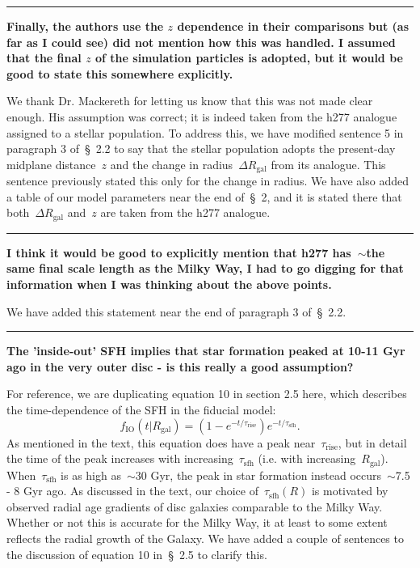 \documentclass{report}
\newcommand{\breakline}{\noindent\rule{\textwidth}{1pt}}
\begin{document}
\par\null\par 
\breakline 
\par\null\par 
\textbf{
	Finally, the authors use the $z$ dependence in their comparisons but (as 
	far as I could see) did not mention how this was handled. 
	I assumed that the final $z$ of the simulation particles is adopted, but it 
	would be good to state this somewhere explicitly. 
} 
\par 
We thank Dr. Mackereth for letting us know that this was not made clear enough. 
His assumption was correct; it is indeed taken from the h277 analogue assigned 
to a stellar population. 
To address this, we have modified sentence 5 in paragraph 3 of~\S~2.2 to say 
that the stellar population adopts the present-day midplane distance~$z$ and 
the change in radius~$\Delta R_\text{gal}$ from its analogue. 
This sentence previously stated this only for the change in radius. 
We have also added a table of our model parameters near the end of~\S~2, and 
it is stated there that both~$\Delta R_\text{gal}$ and~$z$ are taken from 
the h277 analogue. 

\par\null\par 
\breakline 
\par\null\par 
\textbf{
	I think it would be good to explicitly mention that h277 has~$\sim$the same 
	final scale length as the Milky Way, I had to go digging for that 
	information when I was thinking about the above points.
} 
\par 
We have added this statement near the end of paragraph 3 of~\S~2.2. 

\par\null\par 
\breakline 
\par\null\par 
\textbf{
	The 'inside-out' SFH implies that star formation peaked at 10-11 Gyr ago in 
	the very outer disc - is this really a good assumption? 
}
\par 
For reference, we are duplicating equation 10 in section 2.5 here, which 
describes the time-dependence of the SFH in the fiducial model: 
\begin{equation} 
f_\text{IO}(t|R_\text{gal}) = (1 - e^{-t/\tau_\text{rise}})
e^{-t/\tau_\text{sfh}}. 
\end{equation} 
As mentioned in the text, this equation does have a peak 
near~$\tau_\text{rise}$, but in detail the time of the peak increases with 
increasing~$\tau_\text{sfh}$ (i.e. with increasing~$R_\text{gal}$). 
When~$\tau_\text{sfh}$ is as high as~$\sim$30 Gyr, the peak in star formation 
instead occurs~$\sim$7.5 - 8 Gyr ago. 
As discussed in the text, our choice of~$\tau_\text{sfh}(R)$ is motivated by 
observed radial age gradients of disc galaxies comparable to the Milky Way. 
Whether or not this is accurate for the Milky Way, it at least to some extent 
reflects the radial growth of the Galaxy. 
We have added a couple of sentences to the discussion of equation 10 in~\S~2.5 
to clarify this. 
\end{document}
